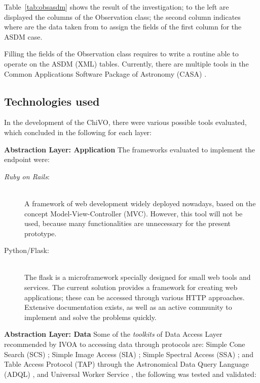 \documentclass[]{spie}
\newcommand{\ror}{\emph{Ruby on Rails}}
\begin{document}
Table~\ref{tab:obsasdm} shows the result of the investigation; to the left are
displayed the columns of the Observation class; the second column indicates
where are the data taken from to assign the fields of the first column for the
ASDM case.

Filling the fields of the Observation class requires to write a routine able to
operate on the ASDM (XML) tables. Currently, there are multiple tools in the
Common Applications Software Package of Astronomy (CASA)
\cite{petry2012analysing}.

\subsection{Technologies used}
In the development of the ChiVO, there were various possible tools evaluated,
which concluded in the following for each layer:

\textbf{Abstraction Layer:  Application}
The frameworks evaluated to implement the endpoint were: 
\begin{description}
    \item[{\ror}:] \hfill \\
        A framework of web development widely deployed nowadays, based on the
        concept Model-View-Controller (MVC).  However, this tool will not be
        used, because many functionalities are unnecessary for the present
        prototype.
    \item[Python/Flask:] \hfill \\
        The flask is a microframework specially designed for small web tools
        and services.  The current solution provides a framework for creating
        web applications; these can be accessed through various HTTP
        approaches.  Extensive documentation exists, as well as an active
        community to implement and solve the problems quickly.
\end{description}

\textbf{Abstraction Layer: Data}
Some of the \emph{toolkits} of Data Access Layer recommended by IVOA to
accessing data through protocols are:  Simple Cone Search (SCS)
\cite{williams2008simple}; Simple Image Access (SIA) \cite{tody2004simple};
Simple Spectral Access (SSA) \cite{tody2008simple}; and Table Access Protocol
(TAP) \cite{dowler2010table} through the Astronomical Data Query Language
(ADQL) \cite{yasuda2004astronomical}, and Universal Worker Service
\cite{rixon2008universal}, the following was tested and validated:
\end{document}
